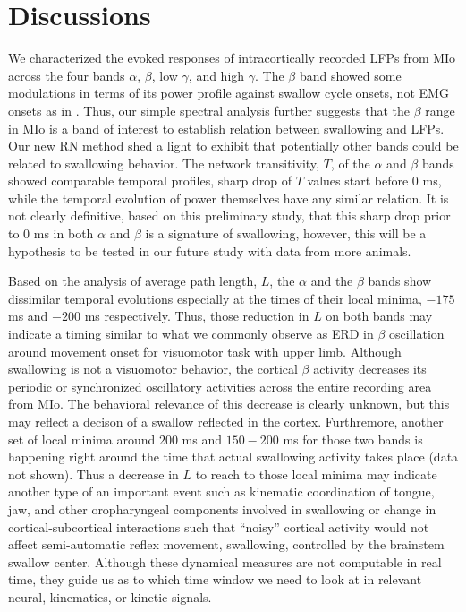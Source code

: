 \documentclass[letterpaper, 9pt, conference]{ieeeconf}
\begin{document}
\section{Discussions}
\label{sec:discussions}
We characterized the evoked responses of intracortically recorded LFPs from MIo across the four bands $\alpha$, $\beta$, low $\gamma$, and high $\gamma$. The $\beta$ band showed some modulations in terms of its power profile against swallow cycle onsets, not EMG onsets as in \cite{Teismann2009}. Thus, our simple spectral analysis further suggests that the $\beta$ range in MIo is a band of interest to establish relation between swallowing and LFPs. Our new RN method shed a light to exhibit that potentially other bands could be related to swallowing behavior. The network transitivity, $T$, of the $\alpha$ and $\beta$ bands showed comparable temporal profiles, sharp drop of $T$ values start before $0$ ms, while the temporal evolution of power themselves have any similar relation. It is not clearly definitive, based on this preliminary study, that this sharp drop prior to $0$ ms in both $\alpha$ and $\beta$ is a signature of swallowing, however, this will be a hypothesis to be tested in our future study with data from more animals. 

Based on the analysis of average path length, $L$, the $\alpha$ and the $\beta$ bands show dissimilar temporal evolutions especially at the times of their local minima, $-175$ ms and $-200$ ms respectively. Thus, those reduction in $L$ on both bands may indicate a timing similar to what we commonly observe as ERD in $\beta$ oscillation around movement onset for visuomotor task with upper limb. Although swallowing is not a visuomotor behavior, the cortical $\beta$ activity decreases its periodic or synchronized oscillatory activities across the entire recording area from MIo. The behavioral relevance of this decrease is clearly unknown, but this may reflect a decison of a swallow reflected in the cortex. Furthremore, another set of local minima around $200$ ms and $150-200$ ms for those two bands is happening right around the time that actual swallowing activity takes place (data not shown). Thus a decrease in $L$ to reach to those local minima may indicate another type of an important event such as  kinematic coordination of tongue, jaw, and other oropharyngeal components involved in swallowing or change in cortical-subcortical interactions such that ``noisy'' cortical activity would not affect semi-automatic reflex movement, swallowing, controlled by the brainstem swallow center. 
Although these dynamical measures are not computable in real time, they guide us as to which time window we need to look at in relevant neural, kinematics, or kinetic signals. 
\end{document}
